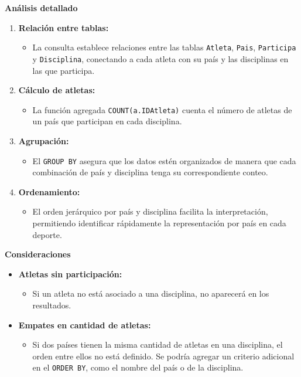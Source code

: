 \textbf{Análisis detallado}

\begin{enumerate}
   \item \textbf{Relación entre tablas:}
   \begin{itemize}
       \item La consulta establece relaciones entre las tablas \texttt{Atleta}, \texttt{Pais}, \texttt{Participa} y \texttt{Disciplina}, conectando a cada atleta con su país y las disciplinas en las que participa.
   \end{itemize}
   
   \item \textbf{Cálculo de atletas:}
   \begin{itemize}
       \item La función agregada \texttt{COUNT(a.IDAtleta)} cuenta el número de atletas de un país que participan en cada disciplina.
   \end{itemize}
   
   \item \textbf{Agrupación:}
   \begin{itemize}
       \item El \texttt{GROUP BY} asegura que los datos estén organizados de manera que cada combinación de país y disciplina tenga su correspondiente conteo.
   \end{itemize}
   
   \item \textbf{Ordenamiento:}
   \begin{itemize}
       \item El orden jerárquico por país y disciplina facilita la interpretación, permitiendo identificar rápidamente la representación por país en cada deporte.
   \end{itemize}
\end{enumerate}

\textbf{Consideraciones}

\begin{itemize}
   \item \textbf{Atletas sin participación:}
   \begin{itemize}
       \item Si un atleta no está asociado a una disciplina, no aparecerá en los resultados.
   \end{itemize}
   \item \textbf{Empates en cantidad de atletas:}
   \begin{itemize}
       \item Si dos países tienen la misma cantidad de atletas en una disciplina, el orden entre ellos no está definido. Se podría agregar un criterio adicional en el \texttt{ORDER BY}, como el nombre del país o de la disciplina.
   \end{itemize}
\end{itemize}

